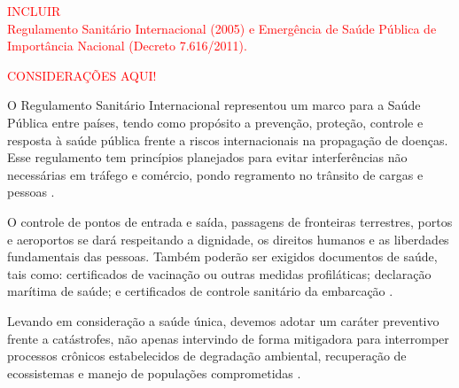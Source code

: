 \textcolor{red}{INCLUIR\\Regulamento Sanitário Internacional (2005) e Emergência de Saúde Pública de
Importância Nacional (Decreto 7.616/2011).}
\begin{center}
\textcolor{red}{CONSIDERAÇÕES AQUI!}\\ 
\end{center}

\indent O Regulamento Sanitário Internacional representou um marco para a Saúde Pública entre países, tendo como propósito a prevenção, proteção, controle e resposta à saúde pública frente a riscos internacionais na propagação de doenças. Esse regulamento tem princípios planejados para evitar interferências não necessárias em tráfego e comércio, pondo regramento no trânsito de cargas e pessoas \cite{Brasil2005RegulamentoSI}.

\indent O controle de pontos de entrada e saída, passagens de fronteiras terrestres, portos e aeroportos se dará respeitando a dignidade, os direitos humanos e as liberdades fundamentais das pessoas. Também poderão ser exigidos documentos de saúde, tais como: certificados de vacinação ou outras medidas profiláticas; declaração marítima de saúde; e certificados de controle sanitário da embarcação \cite{Brasil2005RegulamentoSI}.

\indent Levando em consideração a saúde única, devemos adotar um caráter preventivo frente a catástrofes, não apenas  intervindo de forma mitigadora para interromper processos crônicos estabelecidos de degradação ambiental, recuperação de ecossistemas e manejo de populações comprometidas \cite{Cubas2014Tratado}.

